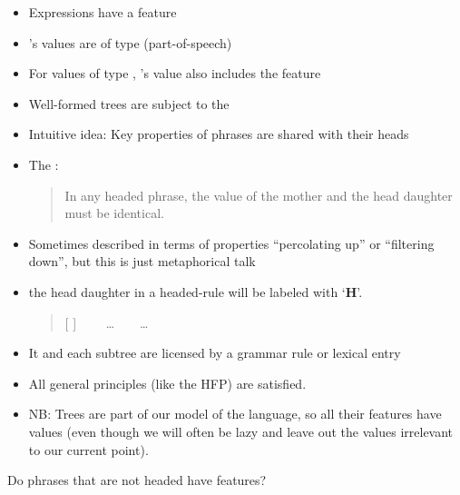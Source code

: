 \documentclass[a4paper,landscape,headrule,footrule]{foils}
\begin{document}
\begin{itemize}
\item Expressions have a feature 
\item {}’s values are of type  (part-of-speech)
\item For  values of type , ’s
  value also includes the feature 
\item Well-formed trees are subject to the 
\end{itemize}

\begin{itemize}
\item Intuitive idea: Key properties of phrases are
shared with their heads
\item The :
  \begin{quote} \large    In any headed phrase, the 
    value of the mother and the head daughter
    must be identical.    
  \end{quote}
\item Sometimes described in terms of properties
“percolating up” or “filtering down”, but this
is just metaphorical talk
\item  the  head daughter in a headed-rule will be labeled with  `{\bf H}'.

  \begin{quote}
    [  ]  \ \ \into  \ \ \ldots \ \ \HD [\ \  \ ]  \ \ \ldots
  \end{quote}


\end{itemize}

\begin{itemize}
\item It and each subtree are licensed by a grammar rule
or lexical entry
\item All general principles (like the HFP) are satisfied.
\item NB: Trees are part of our model of the language,
so all their features have values (even though we
will often be lazy and leave out the values
irrelevant to our current point).
\end{itemize}

Do phrases that are not headed have
 features?

\end{document}
